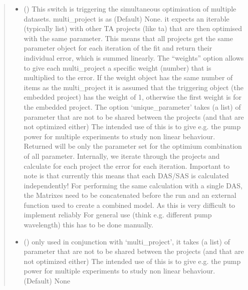 \documentclass[letterpaper,10pt,english]{sphinxmanual}
\begin{document}
\begin{fulllineitems}
\begin{quote}
\begin{description}
\begin{itemize}
\item {} 
 (\sphinxstyleliteralemphasis{\sphinxupquote{ (}}\sphinxstyleliteralemphasis{\sphinxupquote{)}}\sphinxstyleliteralemphasis{\sphinxupquote{, }}) \textendash{} This switch is triggering the simultaneous optimisation of multiple datasets.
multi\_project is as (Default) None. it expects an iterable (typically list) with other
TA projects (like ta) that are then optimised with the same parameter.
This means that all projects get the same parameter object for each iteration
of the fit and return their individual error, which is summed linearly.
The “weights” option allows to give each multi\_project a specific weight (number)
that is multiplied to the error. If the weight object has the same number of items
as the multi\_project it is assumed that the triggering object (the embedded project)
has the weight of 1, otherwise the first weight is for the embedded project.
The option ‘unique\_parameter’ takes (a list) of parameter that are not
to be shared between the projects (and that are not optimized either)
The intended use of this is to give e.g. the pump power for multiple experiments to
study non linear behaviour. Returned will be only the parameter set for the optimium
combination of all parameter. Internally, we iterate through the projects and calculate
for each project the error for each iteration. Important to note is that currently this
means that each DAS/SAS is calculated independently! For performing the same calculation
with a single DAS, the Matrixes need to be concatenated before the run and an external
function used to create a combined model. As this is very difficult to implement reliably
For general use (think e.g. different pump wavelength) this has to be done manually.

\item {} 
 (\sphinxstyleliteralemphasis{\sphinxupquote{ (}}\sphinxstyleliteralemphasis{\sphinxupquote{)}}\sphinxstyleliteralemphasis{\sphinxupquote{, }}) \textendash{} only used in conjunction with ‘multi\_project’, it takes (a list) of parameter that
are not to be shared between the projects (and that are not optimized either)
The intended use of this is to give e.g. the pump power for multiple experiments
to study non linear behaviour. (Default) None


\end{itemize}
\end{description}
\end{quote}
\end{fulllineitems}
\end{document}
